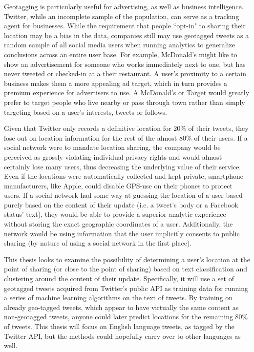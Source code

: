 \documentclass[midd]{thesis}
\begin{document}
Geotagging is particularly useful for advertising, as well as business intelligence. Twitter, while an incomplete sample of the population, can serve as a tracking agent for businesses. While the requirement that people ``opt-in" to sharing their location may be a bias in the data, companies still may use geotagged tweets as a random sample of all social media users when running analytics to generalize conclusions across an entire user base. For example, McDonald's might like to show an advertisement for someone who works immediately next to one, but has never tweeted or checked-in at a their restaurant. A user's proximity to a certain business makes them a more appealing ad target, which in turn provides a premium experience for advertisers to use. A McDonald's or Target would greatly prefer to target people who live nearby or pass through town rather than simply targeting based on a user's interests, tweets or follows.

Given that Twitter only records a definitive location for 20\% of their tweets, they lose out on location information for the rest of the almost 80\% of their users. If a social network were to mandate location sharing, the company would be perceived as grossly violating individual privacy rights and would almost certainly lose many users, thus decreasing the underlying value of their service. Even if the locations were automatically collected and kept private, smartphone manufacturers, like Apple, could disable GPS-use on their phones to protect users. If a social network had some way at guessing the location of a user based purely based on the content of their update (i.e. a tweet's body or a Facebook status' text), they would be able to provide a superior analytic experience without storing the exact geographic coordinates of a user. Additionally, the network would be using information that the user implicitly consents to public sharing (by nature of using a social network in the first place).

This thesis looks to examine the possibility of determining a user's location at the point of sharing (or close to the point of sharing) based on text classification and clustering around the content of their update. Specifically, it will use a set of geotagged tweets acquired from Twitter's public API as training data for running a series of machine learning algorithms on the text of tweets. By training on already geo-tagged tweets, which appear to have virtually the same content as non-geotagged tweets, anyone could later predict locations for the remaining 80\% of tweets. This thesis will focus on English language tweets, as tagged by the Twitter API, but the methods could hopefully carry over to other languages as well.
\end{document}
